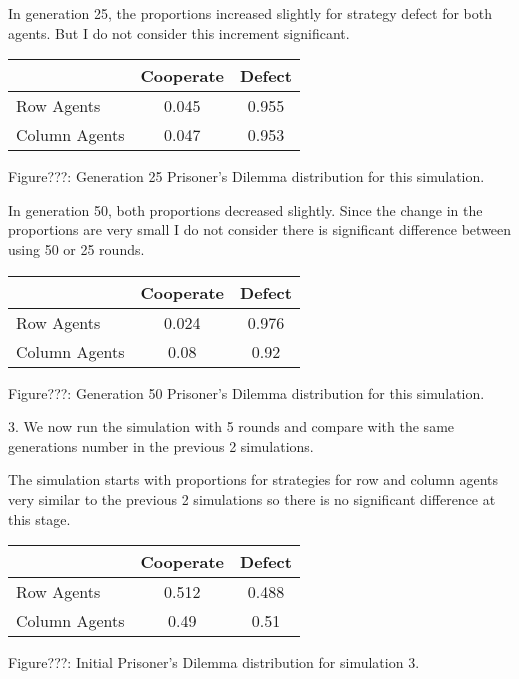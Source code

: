 \documentclass{article}
\begin{document}
In generation 25, the proportions increased slightly for strategy defect for both agents. But I do not consider this increment significant.
\begin{center}
\begin{tabular}{|l|c|c|}
\hline
& Cooperate & Defect \\ 
\hline
Row Agents & 0.045 & 0.955\\
\hline
Column Agents & 0.047 & 0.953\\
\hline
\end{tabular}
\end{center}
\begin{center}
Figure???: Generation 25 Prisoner’s Dilemma distribution for this simulation.
\end{center}


In generation 50, both proportions decreased slightly. Since the change in the proportions are very small I do not consider there is significant difference between using 50 or 25 rounds.
\begin{center}
\begin{tabular}{|l|c|c|}
\hline
& Cooperate & Defect \\ 
\hline
Row Agents & 0.024 & 0.976\\
\hline
Column Agents & 0.08 & 0.92\\
\hline
\end{tabular}
\end{center}
\begin{center}
Figure???: Generation 50 Prisoner’s Dilemma distribution for this simulation.
\end{center}

3. We now run the simulation with 5 rounds and compare with the same generations number in the previous 2 simulations.

The simulation starts with proportions for strategies for row and column agents very similar to the previous 2 simulations so there is no significant difference at this stage.
\begin{center}
\begin{tabular}{|l|c|c|}
\hline
& Cooperate & Defect \\ 
\hline
Row Agents & 0.512 & 0.488\\
\hline
Column Agents & 0.49 & 0.51\\
\hline
\end{tabular}
\end{center}
\begin{center}
Figure???: Initial Prisoner’s Dilemma distribution for simulation 3.
\end{center}
\end{document}
